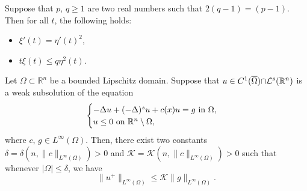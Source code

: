 \documentclass[10pt,a4paper]{amsart}
\def\R{\mathbb{R}}
\newcommand{\De} {\Delta}
\begin{document}
\begin{Lemma}\label{Sa2}
    Suppose that $p,\,q\geq 1$ are two real numbers such that $2(q-1)=(p-1)$. Then for all $t$, the following holds:
    \begin{itemize}
        \item[(a)] $\xi'(t)=\eta'(t)^2$,
        \item[(b)] $t\xi(t)\leq q\eta^2(t)$.
    \end{itemize}     
\end{Lemma}

\begin{Lemma}\label{SML}
     Let $\Omega\subset\R^n$ be a bounded Lipschitz domain. Suppose that $u\in C^1 (\overline{\Omega})\textcolor{black}{\cap \mathcal{L}^s(\R^n)}$ is a weak subsolution of the equation
\begin{align}\label{Sa}
    \begin{cases}
        -\De u+(-\De)^su+c(x)u=g \text{ in }\Omega,\\
        u\leq 0\text{ on }\textcolor{black}{\R^n\setminus\Omega},
    \end{cases}
\end{align}
where $c,\, g\in L^\infty(\Omega).$ Then, there exist two constants $\delta=\delta(n,\|c\|_{L^\infty(\Omega)})>0$ and $\mathcal{K}=\mathcal{K}(n,\|c\|_{L^\infty(\Omega)})>0$
such that whenever $|\Omega|\leq\delta$, we have $$\|u^+\|_{L^\infty(\Omega)}\leq \mathcal{K} \|g\|_{L^\infty(\Omega)}.$$    
\end{Lemma}
\end{document}
